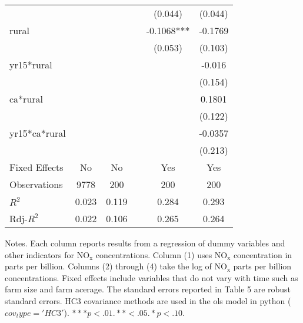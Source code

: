 \documentclass[12pt]{report}
\begin{document}
\begin{table}[h!]
\begin{threeparttable}
\begin{tabular}{lccccc}
               &                   &                   && (0.044)               &                          (0.044) \\ [0.5ex]
rural &                           &                   &&      -0.1068***    &                         -0.1769   \\ [0.5ex]
                &                   &                 & &            (0.053)  &                          (0.103) \\ [0.5ex]
yr15*rural &                    &                  & &                         &                         -0.016  \\ [0.5ex]
                    &                &                  &&                         &                         (0.154) \\ [0.5ex]
ca*rural &                        &                  &&                         &                          0.1801    \\ [0.5ex]
                    &                 &                  & &                       &                          (0.122) \\ [0.5ex]
yr15*ca*rural &                 &                  &  &                       &                        -0.0357    \\ [0.5ex]
                          &           &                  &&                         &                        (0.213) \\ [0.5ex]
Fixed Effects &       No&             No &&                   Yes &                         Yes    \\ [0.5ex]
Observations&            9778 &           200&&                  200 &                         200   \\ [0.5ex]
$R^2$ &                     0.023 &         0.119&&                 0.284 &                      0.293  \\ [0.5ex]
Rdj-$R^2$&                 0.022&        0.106& &                0.265 &                     0.264    \\ [0.5ex]
\hline
\bottomrule
\end{tabular}
\begin{tablenotes}
  
 \item \footnotesize{Notes. Each column reports results from a regression of dummy variables and other indicators for $\text{NO}_\text{x}$ concentrations. Column (1) uses $\text{NO}_\text{x}$ concentration in parts per billion. Columns (2) through (4) take the log of $\text{NO}_\text{x}$ parts per billion concentrations. Fixed effects include variables that do not vary with time such as farm size and farm acerage. The standard errors reported in Table 5 are robust standard errors. HC3 covariance methods are used in the ols model in python ($cov_type='HC3'$). $***p<.01. **<.05. *p<.10.$}

\end{tablenotes}
\label{table:5}
\end{threeparttable}
\end{table}
\clearpage
\end{document}
